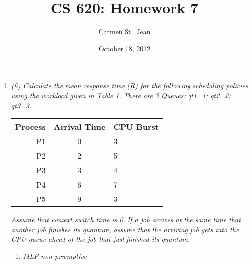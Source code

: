 \documentclass[letterpaper,11pt]{article}
\begin{document}
\title{CS 620: Homework 7}
\date{October 18, 2012}
\author{Carmen St.\ Jean}

\maketitle

\begin{enumerate}
\item \emph{(6) Calculate the mean response time (R) for the following scheduling policies using the workload given in Table 1. There are 3 Queues: qt1=1; qt2=2; qt3=3.}

\begin{center}
  \begin{tabular}{r | c | l }
    Process & Arrival Time & CPU Burst \\ \hline
    \hline
    P1      & 0            & 3 \\ \hline
    P2      & 2            & 5 \\ \hline
    P3      & 3            & 4 \\ \hline
    P4      & 6            & 7 \\ \hline
    P5      & 9            & 3 \\ \hline
    \hline
  \end{tabular}
\end{center}

\emph{Assume that context switch time is 0. If a job arrives at the same time that another job finishes its quantum, assume that the arriving job gets into the CPU queue ahead of the job that just finished its quantum.}

\begin{enumerate}
\item \emph{MLF non-preemptive}


\end{enumerate}
\end{enumerate}
\end{document}
